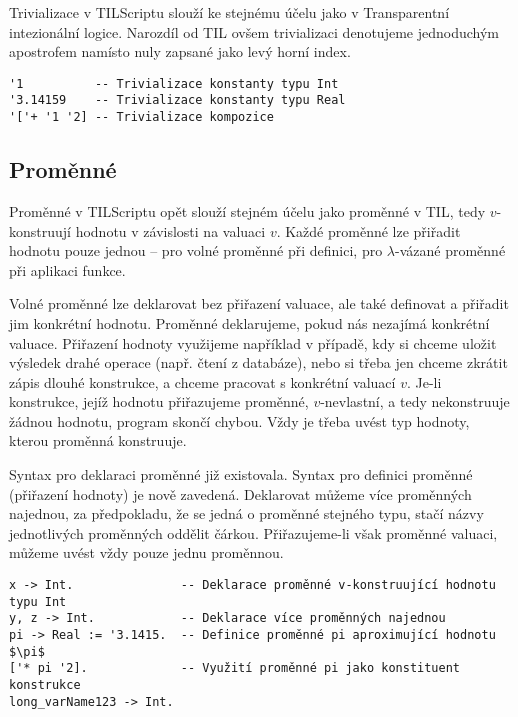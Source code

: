 Trivializace v TILScriptu slouží ke stejnému účelu jako v Transparentní intezionální logice.
Narozdíl od TIL ovšem trivializaci denotujeme jednoduchým apostrofem namísto nuly zapsané jako
levý horní index.

\begin{lstlisting}[caption={Příklad trivializace.}]
'1          -- Trivializace konstanty typu Int
'3.14159    -- Trivializace konstanty typu Real
'['+ '1 '2] -- Trivializace kompozice
\end{lstlisting}

\subsection{Proměnné}

Proměnné v TILScriptu opět slouží stejném účelu jako proměnné v TIL, tedy $v$-konstruují hodnotu
v závislosti na valuaci $v$. Každé proměnné lze přiřadit hodnotu pouze jednou -- pro volné proměnné
při definici, pro $\lambda$-vázané proměnné při aplikaci funkce.

Volné proměnné lze deklarovat bez přiřazení valuace, ale také definovat a přiřadit jim konkrétní
hodnotu. Proměnné deklarujeme, pokud nás nezajímá konkrétní valuace. Přiřazení hodnoty využijeme
například v případě, kdy si chceme uložit výsledek drahé operace (např. čtení z databáze), nebo
si třeba jen chceme zkrátit zápis dlouhé konstrukce, a chceme pracovat s konkrétní valuací $v$.
Je-li konstrukce, jejíž hodnotu přiřazujeme proměnné, $v$-nevlastní, a tedy nekonstruuje žádnou
hodnotu, program skončí chybou. Vždy je třeba uvést typ hodnoty, kterou proměnná konstruuje.

Syntax pro deklaraci proměnné již existovala. Syntax pro definici proměnné (přiřazení hodnoty)
je nově zavedená. Deklarovat můžeme více proměnných najednou, za předpokladu, že se jedná o
proměnné stejného typu, stačí názvy jednotlivých proměnných oddělit čárkou. Přiřazujeme-li však
proměnné valuaci, můžeme uvést vždy pouze jednu proměnnou.

\begin{lstlisting}[caption={Příklad využití proměnných}]
x -> Int.               -- Deklarace proměnné v-konstruující hodnotu typu Int
y, z -> Int.            -- Deklarace více proměnných najednou
pi -> Real := '3.1415.  -- Definice proměnné pi aproximující hodnotu $\pi$
['* pi '2].             -- Využití proměnné pi jako konstituent konstrukce
long_varName123 -> Int.
\end{lstlisting}

